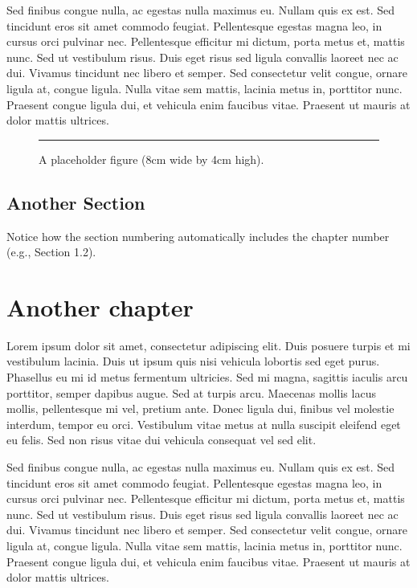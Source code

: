\documentclass[
  digital,     %
  oneside,     %
  nosansbold,  %
  nocolorbold, %
  lof,         %
  lot,         %
]{fithesis4}
\begin{document}
Sed finibus congue nulla, ac egestas nulla maximus eu. Nullam quis ex est. Sed tincidunt eros sit amet commodo feugiat. Pellentesque egestas magna leo, in cursus orci pulvinar nec. Pellentesque efficitur mi dictum, porta metus et, mattis nunc. Sed ut vestibulum risus. Duis eget risus sed ligula convallis laoreet nec ac dui. Vivamus tincidunt nec libero et semper. Sed consectetur velit congue, ornare ligula at, congue ligula. Nulla vitae sem mattis, lacinia metus in, porttitor nunc. Praesent congue ligula dui, et vehicula enim faucibus vitae. Praesent ut mauris at dolor mattis ultrices.

\begin{figure}[ht]
    \centering
    \rule{8cm}{4cm} %
    \caption{A placeholder figure (8cm wide by 4cm high).}
    \label{fig:example}
\end{figure}

\section{Another Section}
Notice how the section numbering automatically includes the chapter number (e.g., Section 1.2).

\chapter{Another chapter}
Lorem ipsum dolor sit amet, consectetur adipiscing elit. Duis posuere turpis et mi vestibulum lacinia. Duis ut ipsum quis nisi vehicula lobortis sed eget purus. Phasellus eu mi id metus fermentum ultricies. Sed mi magna, sagittis iaculis arcu porttitor, semper dapibus augue. Sed at turpis arcu. Maecenas mollis lacus mollis, pellentesque mi vel, pretium ante. Donec ligula dui, finibus vel molestie interdum, tempor eu orci. Vestibulum vitae metus at nulla suscipit eleifend eget eu felis. Sed non risus vitae dui vehicula consequat vel sed elit.

Sed finibus congue nulla, ac egestas nulla maximus eu. Nullam quis ex est. Sed tincidunt eros sit amet commodo feugiat. Pellentesque egestas magna leo, in cursus orci pulvinar nec. Pellentesque efficitur mi dictum, porta metus et, mattis nunc. Sed ut vestibulum risus. Duis eget risus sed ligula convallis laoreet nec ac dui. Vivamus tincidunt nec libero et semper. Sed consectetur velit congue, ornare ligula at, congue ligula. Nulla vitae sem mattis, lacinia metus in, porttitor nunc. Praesent congue ligula dui, et vehicula enim faucibus vitae. Praesent ut mauris at dolor mattis ultrices.
\end{document}
